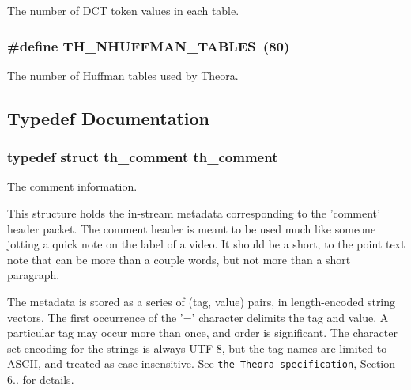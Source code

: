 The number of D\+C\+T token values in each table. \hypertarget{theora_2libtheora-1_81_81_2include_2theora_2codec_8h_a49bf449eae33c5320f0c308f32c6ae42}{
\subsubsection[{T\+H\+\_\+\+N\+H\+U\+F\+F\+M\+A\+N\+\_\+\+T\+A\+B\+L\+E\+S}]{\setlength{\rightskip}{0pt plus 5cm}\#define T\+H\+\_\+\+N\+H\+U\+F\+F\+M\+A\+N\+\_\+\+T\+A\+B\+L\+E\+S~(80)}}\label{theora_2libtheora-1_81_81_2include_2theora_2codec_8h_a49bf449eae33c5320f0c308f32c6ae42}
The number of Huffman tables used by Theora. 

\subsection{Typedef Documentation}
\hypertarget{theora_2libtheora-1_81_81_2include_2theora_2codec_8h_a96239eba5d663e3d9ccb40031b2dcfe4}{
\subsubsection[{th\+\_\+comment}]{\setlength{\rightskip}{0pt plus 5cm}typedef struct {\bf th\+\_\+comment} {\bf th\+\_\+comment}}}\label{theora_2libtheora-1_81_81_2include_2theora_2codec_8h_a96239eba5d663e3d9ccb40031b2dcfe4}
The comment information.

This structure holds the in-\/stream metadata corresponding to the 'comment' header packet. The comment header is meant to be used much like someone jotting a quick note on the label of a video. It should be a short, to the point text note that can be more than a couple words, but not more than a short paragraph.

The metadata is stored as a series of (tag, value) pairs, in length-\/encoded string vectors. The first occurrence of the '=' character delimits the tag and value. A particular tag may occur more than once, and order is significant. The character set encoding for the strings is always U\+T\+F-\/8, but the tag names are limited to A\+S\+C\+I\+I, and treated as case-\/insensitive. See \href{http://www.theora.org/doc/Theora.pdf}{\tt the Theora specification}, Section 6.. for details.

